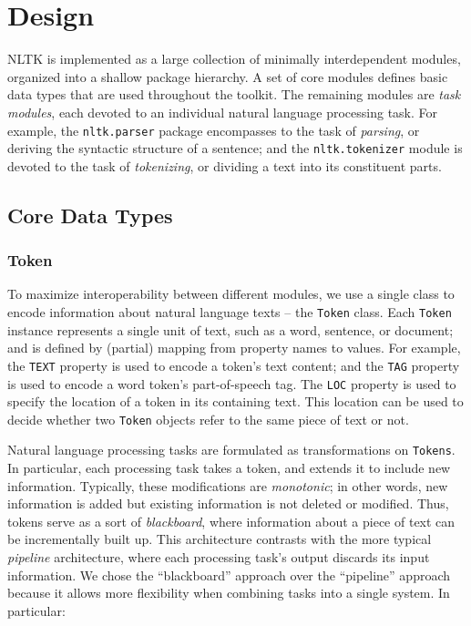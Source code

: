 \documentclass{article}
\begin{document}
\section{Design}

NLTK is implemented as a large collection of minimally interdependent
modules, organized into a shallow package hierarchy.  A set of core
modules defines basic data types that are used throughout the toolkit.  
The remaining modules are \emph{task modules}, each devoted to an
individual natural language processing task.  For example, the
\texttt{nltk.parser} package encompasses to the task of
\emph{parsing}, or deriving the syntactic structure of a sentence; and
the \texttt{nltk.tokenizer} module is devoted to the task of
\emph{tokenizing}, or dividing a text into its constituent parts.

\subsection{Core Data Types}

\subsubsection{Token}

To maximize interoperability between different modules, we use a
single class to encode information about natural language texts -- the
\texttt{Token} class.  Each \texttt{Token} instance represents a
single unit of text, such as a word, sentence, or document; and is
defined by (partial) mapping from property names to values.  For
example, the \texttt{TEXT} property is used to encode a token's text
content; and the \texttt{TAG} property is used to encode a word
token's part-of-speech tag.  The \texttt{LOC} property is used to
specify the location of a token in its containing text.  This location
can be used to decide whether two \texttt{Token} objects refer to the
same piece of text or not.

Natural language processing tasks are formulated as transformations on
\texttt{Tokens}.  In particular, each processing task takes a token,
and extends it to include new information.  Typically, these
modifications are \emph{monotonic}; in other words, new information is
added but existing information is not deleted or modified.  Thus,
tokens serve as a sort of \emph{blackboard}, where information about a
piece of text can be incrementally built up.  This architecture
contrasts with the more typical \emph{pipeline} architecture, where
each processing task's output discards its input information.  We
chose the ``blackboard'' approach over the ``pipeline'' approach
because it allows more flexibility when combining tasks into a single
system.  In particular:
\end{document}
